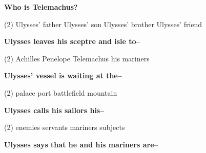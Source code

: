 \documentclass[12pt,a4paper]{exam}
\begin{document}
\begin{questions}

	\begin{minipage}{\textwidth}
		\question \textbf{Who is Telemachus?}

		\begin{tasks}(2)
			\task Ulysses' father
			\task Ulysses' son
			\task Ulysses' brother
			\task Ulysses' friend
		\end{tasks}
	\end{minipage}


	\begin{minipage}{\textwidth}
		\question \textbf{Ulysses leaves his sceptre and isle to--}

		\begin{tasks}(2)
			\task Achilles
			\task Penelope
			\task Telemachus
			\task his mariners
		\end{tasks}
	\end{minipage}


	\begin{minipage}{\textwidth}
		\question \textbf{Ulysses' vessel is waiting at the--}

		\begin{tasks}(2)
			\task palace
			\task port
			\task battlefield
			\task mountain
		\end{tasks}
	\end{minipage}


	\begin{minipage}{\textwidth}
		\question \textbf{Ulysses calls his sailors his--}

		\begin{tasks}(2)
			\task enemies
			\task servants
			\task mariners
			\task subjects
		\end{tasks}
	\end{minipage}


	\begin{minipage}{\textwidth}
		\question \textbf{Ulysses says that he and his mariners are--}


\end{minipage}
\end{questions}
\end{document}
